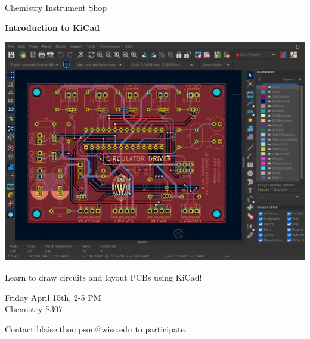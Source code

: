 \documentclass{article}
\begin{document}
\center

\Huge

Chemistry Instrument Shop

\textbf{
Introduction to KiCad
}

\includegraphics[width=\linewidth]{coverart.png}

{
\huge
Learn to draw circuits and layout PCBs using KiCad!
}

\vfill

{
\huge
Friday April 15th, 2-5 PM \\
Chemistry S307
}

\vfill

{
\huge
Contact blaise.thompson@wisc.edu to participate.
}
\end{document}
